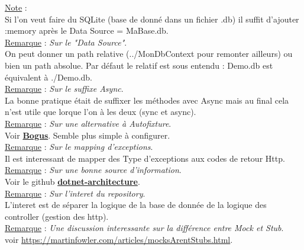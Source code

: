 \documentclass[a4paper,12pt,twoside]{article}
\newcommand{\urlcolor}{magenta}  %
\newcommand{\keycolor}{purple} %
\newcommand{\rem}[2]{\noindent\underline{Remarque} : \textit{#1}.\\ \indent #2}
\newcommand{\note}[1]{\noindent\underline{Note} : \\ \indent #1}
\newcommand{\keyref}[2]{\hypersetup{urlcolor=\keycolor} \href{#1}{\textbf{#2}}\hypersetup{urlcolor=\urlcolor}}
\begin{document}
\note{Si l'on veut faire du SQLite (base de donné dans un fichier .db) il suffit d'ajouter :memory après le Data Source = MaBase.db.}\\

\rem{Sur le "Data Source"}{On peut donner un path relative (../MonDbContext pour remonter ailleurs) ou bien un path absolue. Par défaut le relatif est sous entendu : Demo.db est équivalent à ./Demo.db.}\\

\rem{Sur le suffixe Async}{La bonne pratique était de suffixer les méthodes avec Async mais au final cela n'est utile que lorque l'on à les deux (sync et async).}\\

\rem{Sur une alternative à Autofixture}{Voir \keyref{https://github.com/bchavez/Bogus}{Bogus}. Semble plus simple à configurer.}\\

\rem{Sur le mapping d'exceptions}{Il est interessant de mapper des Type d'exceptions aux codes de retour Http.}\\

\rem{Sur une bonne source d'information}{Voir le github \keyref{https://github.com/dotnet-architecture}{dotnet-architecture}.}\\

\rem{Sur l'interet du repository}{L'interet est de séparer la logique de la base de donnée de la logique des controller (gestion des http).}\\

\rem{Une discussion interessante sur la différence entre Mock et Stub}{voir \url{https://martinfowler.com/articles/mocksArentStubs.html}.}\\

\end{document}
